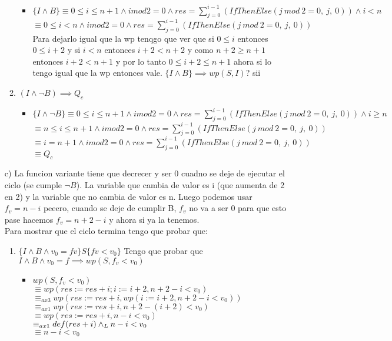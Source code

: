 \documentclass{article}
\begin{document}
\begin{itemize}
\begin{enumerate}
\begin{itemize}
            \item $\{I \land B\} \equiv 0 \leq i \leq n + 1 \land i mod 2 = 0 \land res = \sum_{j=0}^{i-1} (IfThenElse(j\ mod\ 2 = 0,\ j,\ 0)) \land i < n$\\
            $\equiv 0 \leq i < n \land i mod 2 = 0 \land res = \sum_{j=0}^{i-1} (IfThenElse(j\ mod\ 2 = 0,\ j,\ 0))$ \\
            Para dejarlo igual que la wp tenqgo que ver que si $0 \leq i$ entonces $0 \leq i + 2$ y si $i < n$ entonces $i + 2 < n + 2$ y como $n + 2 \geq n + 1$ entonces $i + 2 < n + 1$ y por lo tanto $0 \leq i + 2 \leq n + 1$ ahora si lo tengo igual que la wp entonces vale. $\{I \land B\} \implies wp(S, I)$? sii \checkmark
        \end{itemize}
        \item $(I \land \lnot B) \implies Q_c$
        \begin{itemize}
            \item $\{I \land \lnot B\} \equiv 0 \leq i \leq n + 1 \land i mod 2 = 0 \land res = \sum_{j=0}^{i-1} (IfThenElse(j\ mod\ 2 = 0,\ j,\ 0)) \land i \geq n$\\
            $\equiv n \leq i \leq n + 1 \land i mod 2 = 0 \land res = \sum_{j=0}^{i-1} (IfThenElse(j\ mod\ 2 = 0,\ j,\ 0))$\\
            $\equiv i = n + 1 \land i mod 2 = 0 \land res = \sum_{j=0}^{i-1} (IfThenElse(j\ mod\ 2 = 0,\ j,\ 0))$\\
            $\equiv Q_c$ \checkmark
        \end{itemize}
    \end{enumerate}

    \item [c)] La funcion variante tiene que decrecer y ser 0 cuadno se deje de ejecutar el ciclo (se cumple $\lnot B$). La variable que cambia de valor es i (que aumenta de 2 en 2) y la variable que no cambia de valor es n. Luego podemos usar $f_v = n - i$ peeero, cuando se deje de cumplir B, $f_v$ no va a ser 0 para que esto pase hacemos $f_v = n + 2 - i$ y ahora si ya la tenemos.\\
    Para mostrar que el ciclo termina tengo que probar que:
    \begin{enumerate}
        \item $\{I \land B \land v_0 = fv\} S \{fv < v_0\}$
        Tengo que probar que $I \land B \land v_0 = f \implies wp(S, f_v < v_0)$
        \begin{itemize}
            \item $wp(S, f_v < v_0)$\\
            $\equiv wp(res := res + i; i:= i + 2, n + 2 - i < v_0)$\\
            $\equiv_{ax3} wp(res := res + i, wp(i:= i + 2, n + 2 - i < v_0))$\\
            $\equiv_{ax1} wp(res := res + i, n + 2 - (i + 2) < v_0)$\\
            $\equiv wp(res := res + i, n - i < v_0)$\\
            $\equiv_{ax1} def(res + i) \land _L n - i < v_0$\\
            $\equiv n - i < v_0$


\end{itemize}
\end{enumerate}
\end{itemize}
\end{document}
